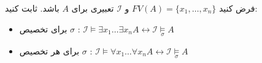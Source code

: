 \documentclass[]{exam}
\begin{document}
فرض کنید $FV(A) = \lbrace x_1, \dots, x_n \rbrace$ و $\mathscr{I}$ تعبیری برای $A$ باشد. ثابت کنید:
\begin{itemize}
    \item برای تخصیص $\sigma$ : $\mathscr{I} \models \exists x_1 \dots \exists x_n A \longleftrightarrow \mathscr{I} \underset{\sigma}{\models} A$
    \item برای هر تخصیص $\sigma$ : $\mathscr{I} \models \forall x_1 \dots \forall x_n A \longleftrightarrow \mathscr{I} \underset{\sigma}{\models} A$
\end{itemize}
\end{document}
